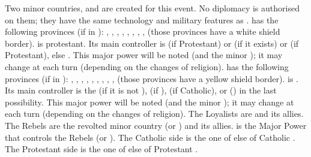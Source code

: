 \phevnt
{} Two minor countries, \paysHuguenots and
\paysLigue are created for this event. No diplomacy is authorised on them;
they have the same technology and military features as \FRA.
\bparag \hug has the following provinces (if in \FRA): \provinceCaux,
\provinceTouraine, \provincePoitou, \provinceQuercy, \provinceGuyenne,
\provinceLanguedoc, \provinceBearn, \provinceDauphine, \provinceCevennes
(those provinces have a white shield border).
\bparag \hug is protestant.
\bparag Its main controller is \ENG (if Protestant) or \HOL (if it exists) or
\SUE (if Protestant), else \MAJHOL. This major power will be noted \HUG (and
the minor \hug); it may change at each turn (depending on the changes of
religion).
\aparag[La Ligue]
\bparag \lig has the following provinces (if in \FRA):
\provinceNormandie, \provinceMaine, ,
\provinceOrleanais, \provincePicardie, \provinceChampagne, \provinceBerry,
\provinceBourgogne, \provinceLyonnais, \provinceProvence (those provinces have
a yellow shield border).
\bparag \lig is \CATHCR.
\bparag Its main controller is the \SDCF (if it is not \FRA), \SPA (if
\CATHCR), \ENG (if Catholic), or \SPA (\CATHCO) in the last possibility.  This
major power will be noted \LIG (and the minor \lig); it may change at each
turn (depending on the changes of religion).
\aparag The Loyalists are \FRA and its allies. The Rebels are the revolted
minor country (\lig or \hug) and its allies. \REB is the Major Power that
controls the Rebels (\LIG or \HUG).
\aparag The Catholic side is the one of \lig else of Catholic \FRA.
\aparag The Protestant side is the one of \hug else of Protestant \FRA.

